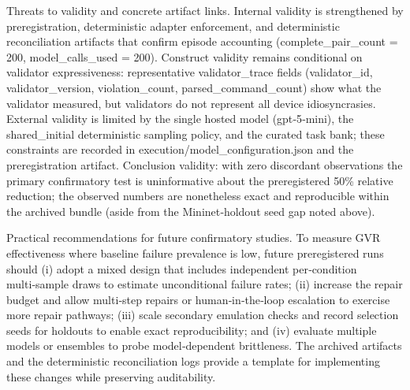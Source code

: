 \documentclass[conference]{IEEEtran}
\begin{document}
Threats to validity and concrete artifact links. Internal validity is strengthened by preregistration, deterministic adapter enforcement, and deterministic reconciliation artifacts that confirm episode accounting (complete\_pair\_count = 200, model\_calls\_used = 200). Construct validity remains conditional on validator expressiveness: representative validator\_trace fields (validator\_id, validator\_version, violation\_count, parsed\_command\_count) show what the validator measured, but validators do not represent all device idiosyncrasies. External validity is limited by the single hosted model (gpt‑5‑mini), the shared\_initial deterministic sampling policy, and the curated task bank; these constraints are recorded in execution/model\_configuration.json and the preregistration artifact. Conclusion validity: with zero discordant observations the primary confirmatory test is uninformative about the preregistered 50\% relative reduction; the observed numbers are nonetheless exact and reproducible within the archived bundle (aside from the Mininet‑holdout seed gap noted above).

Practical recommendations for future confirmatory studies. To measure GVR effectiveness where baseline failure prevalence is low, future preregistered runs should (i) adopt a mixed design that includes independent per‑condition multi‑sample draws to estimate unconditional failure rates; (ii) increase the repair budget and allow multi‑step repairs or human‑in‑the‑loop escalation to exercise more repair pathways; (iii) scale secondary emulation checks and record selection seeds for holdouts to enable exact reproducibility; and (iv) evaluate multiple models or ensembles to probe model‑dependent brittleness. The archived artifacts and the deterministic reconciliation logs provide a template for implementing these changes while preserving auditability.
\end{document}
